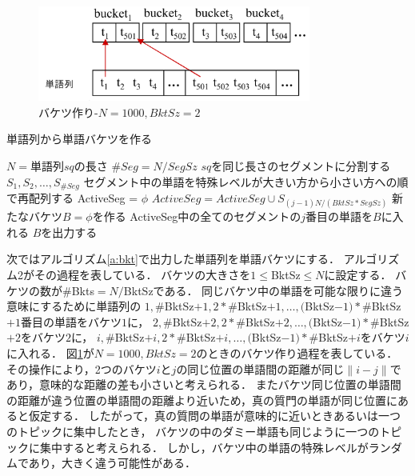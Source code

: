 \documentclass[master]{suribt}
\theoremstyle{definition}
\begin{document}
 \begin{figure}[!hbp]
  \centering
  \includegraphics[width=0.8\textwidth,natwidth=5677,natheight=1982]{rk11.png}
  \caption{バケツ作り-$N=1000,BktSz=2$}\label{fig:bkt}
 \end{figure}

 \begin{algorithm}
 \caption{単語列から単語バケツを作る}
 \begin{algorithmic}[1]
  \State $N=$単語列$sq$の長さ
  \State $\#Seg=N/SegSz$
  \State $sq$を同じ長さのセグメントに分割する$S_1,S_2, \dots , S_{\#Seg}$
  \State セグメント中の単語を特殊レベルが大きい方から小さい方への順で再配列する
   \State ActiveSeg = $\phi$
    \State $ActiveSeg = ActiveSeg \cup S_{(j-1)N/(BktSz * SegSz)}$
   \EndFor
    \State 新たなバケツ$B=\phi$を作る
    \State ActiveSeg中の全てのセグメントの$j$番目の単語を$B$に入れる
    \State $B$を出力する
   \EndFor
  \EndFor
 \EndFunction
 \end{algorithmic}
 \label{a:bkt2}
 \end{algorithm}
 
 次ではアルゴリズム\ref{a:bkt}で出力した単語列を単語バケツにする．
 アルゴリズム2がその過程を表している．
 バケツの大きさを$1 \leq$BktSz$\leq N$に設定する．
 バケツの数が\#Bkts$=N/$BktSzである．
 同じバケツ中の単語を可能な限りに違う意味にするために単語列の
 $1,\#$BktSz$+1,2*\#$BktSz$+1, \dots,($BktSz$-1)*\#$BktSz$+1$番目の単語をバケツ$1$に，
 $2,\#$BktSz$+2,2*\#$BktSz$+2, \dots,($BktSz$-1)*\#$BktSz$+2$をバケツ$2$に，
 $i,\#$BktSz$+i,2*\#$BktSz$+i, \dots,($BktSz$-1)*\#$BktSz$+i$をバケツ$i$に入れる．
 図\ref{fig:bkt}が$N=1000,BktSz=2$のときのバケツ作り過程を表している．
 その操作により，2つのバケツ$i$と$j$の同じ位置の単語間の距離が同じ$\|i-j\|$であり，意味的な距離の差も小さいと考えられる．
 またバケツ同じ位置の単語間の距離が違う位置の単語間の距離より近いため，真の質門の単語が同じ位置にあると仮定する．
 したがって，真の質問の単語が意味的に近いときあるいは一つのトピックに集中したとき，
 バケツの中のダミー単語も同じように一つのトピックに集中すると考えられる．
 しかし，バケツ中の単語の特殊レベルがランダムであり，大きく違う可能性がある．
\end{document}
